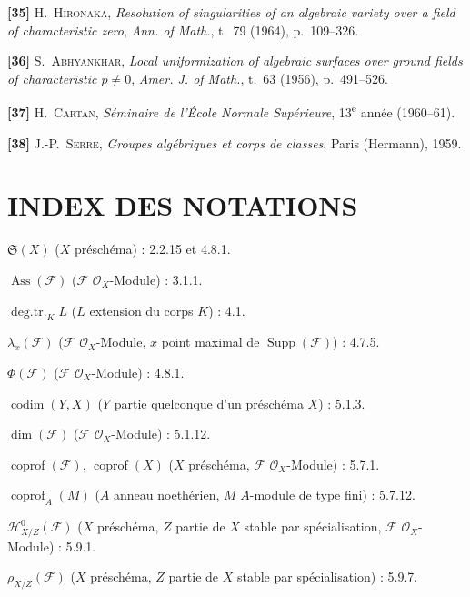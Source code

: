 \textbf{[35]} H.~\textsc{Hironaka}, \emph{Resolution of singularities of an
algebraic variety over a field of characteristic zero}, \emph{Ann. of Math.},
t.~79 (1964), p.~109--326.

\textbf{[36]} S.~\textsc{Abhyankhar}, \emph{Local uniformization of algebraic
surfaces over ground fields of characteristic $p\ne0$}, \emph{Amer. J. of
Math.}, t.~63 (1956), p.~491--526.

\textbf{[37]} H.~\textsc{Cartan}, \emph{Séminaire de l'École Normale
Supérieure}, 13\textsuperscript{e} année (1960--61).

\textbf{[38]} J.-P.~\textsc{Serre}, \emph{Groupes algébriques et corps de
classes}, Paris (Hermann), 1959.

\endgroup

\clearpage
{}
{}
\section*{INDEX DES NOTATIONS}

\begingroup
\small
\setlength{\parindent}{0pt}
\setlength{\parskip}{2pt}

$\mathfrak S(X)$ ($X$ préschéma) : 2.2.15 et 4.8.1.

$\operatorname{Ass}(\mathscr F)$ ($\mathscr F$ $\mathcal O_X$-Module) : 3.1.1.

$\operatorname{deg.tr.}_K L$ ($L$ extension du corps $K$) : 4.1.

$\lambda_x(\mathscr F)$ ($\mathscr F$ $\mathcal O_X$-Module, $x$ point maximal
de $\operatorname{Supp}(\mathscr F)$) : 4.7.5.

$\Phi(\mathscr F)$ ($\mathscr F$ $\mathcal O_X$-Module) : 4.8.1.

$\operatorname{codim}(Y,X)$ ($Y$ partie quelconque d'un préschéma $X$) : 5.1.3.

$\dim(\mathscr F)$ ($\mathscr F$ $\mathcal O_X$-Module) : 5.1.12.

$\operatorname{coprof}(\mathscr F)$, $\operatorname{coprof}(X)$ ($X$
préschéma, $\mathscr F$ $\mathcal O_X$-Module) : 5.7.1.

$\operatorname{coprof}_A(M)$ ($A$ anneau noethérien, $M$ $A$-module de type
fini) : 5.7.12.

$\mathcal H^0_{X/Z}(\mathscr F)$ ($X$ préschéma, $Z$ partie de $X$ stable par
spécialisation, $\mathscr F$ $\mathcal O_X$-Module) : 5.9.1.

$\rho_{X/Z}(\mathscr F)$ ($X$ préschéma, $Z$ partie de $X$ stable par
spécialisation) : 5.9.7.

